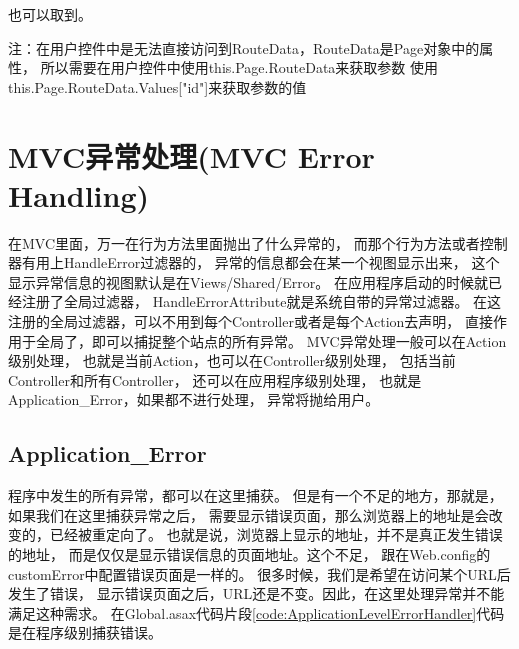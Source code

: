 \documentclass{book}
\begin{document}
也可以取到。
 
注：在用户控件中是无法直接访问到RouteData，RouteData是Page对象中的属性，
所以需要在用户控件中使用this.Page.RouteData来获取参数
使用this.Page.RouteData.Values["id"]来获取参数的值

\section{MVC异常处理(MVC Error Handling)}

在MVC里面，万一在行为方法里面抛出了什么异常的，
而那个行为方法或者控制器有用上HandleError过滤器的，
异常的信息都会在某一个视图显示出来，
这个显示异常信息的视图默认是在Views/Shared/Error。
在应用程序启动的时候就已经注册了全局过滤器，
HandleErrorAttribute就是系统自带的异常过滤器。
在这注册的全局过滤器，可以不用到每个Controller或者是每个Action去声明，
直接作用于全局了，即可以捕捉整个站点的所有异常。
MVC异常处理一般可以在Action级别处理，
也就是当前Action，也可以在Controller级别处理，
包括当前Controller和所有Controller，
还可以在应用程序级别处理，
也就是Application\_Error，如果都不进行处理，
异常将抛给用户。

\subsection{Application\_Error}

程序中发生的所有异常，都可以在这里捕获。
但是有一个不足的地方，那就是，如果我们在这里捕获异常之后，
需要显示错误页面，那么浏览器上的地址是会改变的，已经被重定向了。
也就是说，浏览器上显示的地址，并不是真正发生错误的地址，
而是仅仅是显示错误信息的页面地址。这个不足，
跟在Web.config的customError中配置错误页面是一样的。
很多时候，我们是希望在访问某个URL后发生了错误，
显示错误页面之后，URL还是不变。因此，在这里处理异常并不能满足这种需求。
在Global.asax代码片段\ref{code:ApplicationLevelErrorHandler}代码是在程序级别捕获错误。
\end{document}
